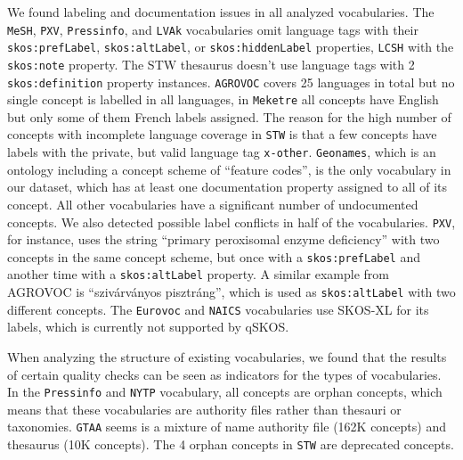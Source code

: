 We found labeling and documentation issues in all analyzed vocabularies. 
The \texttt{MeSH}, \texttt{PXV}, \texttt{Pressinfo}, and \texttt{LVAk} vocabularies omit language tags with their \texttt{skos:prefLabel}, \texttt{skos:altLabel}, or \texttt{skos:hiddenLabel} properties, \texttt{LCSH} with the \texttt{skos:note} property. The STW thesaurus doesn't use language tags with 2 \texttt{skos:definition} property instances.
\texttt{AGROVOC} covers 25 languages in total but no single concept is labelled in all languages, in \texttt{Meketre} all concepts have English but only some of them French labels assigned. The reason for the high number of concepts with incomplete language coverage in \texttt{STW} is that a few concepts have labels with the private, but valid language tag \texttt{x-other}. 
\texttt{Geonames}, which is an ontology including a concept scheme of ``feature codes'', is the only vocabulary in our dataset, which has at least one documentation property assigned to all of its concept. All other vocabularies have a significant number of undocumented concepts.
We also detected possible label conflicts in half of the vocabularies. \texttt{PXV}, for instance, uses the string ``primary peroxisomal enzyme deficiency'' with two concepts in the same concept scheme, but once with a \texttt{skos:prefLabel} and another time with a \texttt{skos:altLabel} property. A similar example from AGROVOC is ``sziv\'{a}rv\'{a}nyos pisztr\'{a}ng'', which is used as \texttt{skos:altLabel} with two different concepts.
The \texttt{Eurovoc} and \texttt{NAICS} vocabularies use SKOS-XL for its labels, which is currently not supported by qSKOS.


When analyzing the structure of existing vocabularies, we found that the results of certain quality checks can be seen as indicators for the types of vocabularies.
In the \texttt{Pressinfo} and \texttt{NYTP} vocabulary, all concepts are orphan concepts, which means that these vocabularies are authority files rather than thesauri or taxonomies. \texttt{GTAA} seems is a mixture of name authority file (162K concepts) and thesaurus (10K concepts). The 4 orphan concepts in \texttt{STW} are deprecated concepts.


